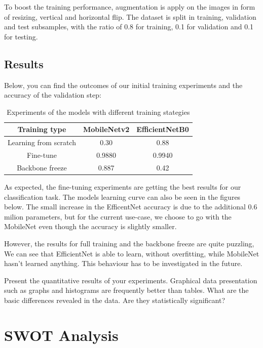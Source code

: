 \documentclass[runningheads,a4paper,11pt]{report}
\begin{document}
To boost the training performance, augmentation is apply on the images in form of resizing, vertical and horizontal flip. The dataset is split in training, validation and test subsamples, with the ratio of 0.8 for training, 0.1 for validation and 0.1 for testing. 



\section{Results}
\label{section:results}

Below, you can find the outcomes of our initial training experiments and the accuracy of the validation step:

\begin{table}[htb]
\centering
\begin{tabular}{|c|c|c|}
\hline
\textbf{Training type} & \textbf{MobileNetv2} & \textbf{EfficientNetB0} \\
\hline
Learning from scratch & 0.30 & 0.88 \\
\hline
Fine-tune & 0.9880 & 0.9940 \\
\hline
Backbone freeze & 0.887 & 0.42 \\
\hline
\end{tabular}
\caption{Experiments of the models with different training stategies}
\label{tab:results_sgd}
\end{table}

As expected, the fine-tuning experiments are getting the best results for our classification task. The models learning curve can also be seen in the figures below. The 
small increase in the EfficentNet accuracy is due to the additional 0.6 milion parameters, but for the current use-case, we choose to go with the MobileNet even though the accuracy is slightly smaller.  

However, the results for full training and the backbone freeze are quite puzzling, We can see that EfficientNet is able to learn, without overfitting, while MobileNet hasn't learned anything. This behaviour has to be investigated in the future.

Present the quantitative results of your experiments. Graphical data presentation such as graphs and histograms are frequently better than tables. What are the basic differences revealed in the data. Are they statistically significant?


\chapter{SWOT Analysis}
\label{chapter:swot}
\end{document}
